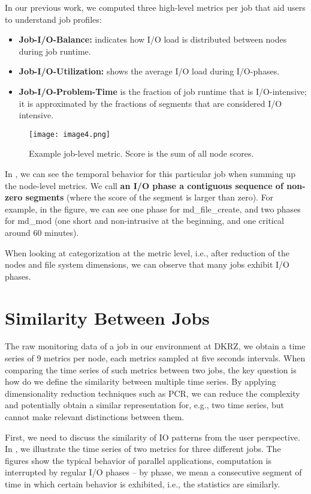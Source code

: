 \documentclass{jhps}
\begin{document}
In our previous work, we computed three high-level metrics per job that aid users to understand job profiles:

\begin{itemize}
	\item \textbf{Job-I/O-Balance:} indicates how I/O load is distributed between nodes during job runtime.
	\item \textbf{Job-I/O-Utilization:} shows the average I/O load during I/O-phases.
	\item \textbf{Job-I/O-Problem-Time} is the fraction of job runtime that is I/O-intensive; it is approximated by the fractions of segments that are considered I/O intensive.
\end{itemize}

\begin{figure}[!bt]
	\centering
	\texttt{[image: image4.png]}
	\caption{Example job-level metric.
Score is the sum of all node scores.}
	\label{fig:seg_example}
\end{figure}

In , we can see the temporal behavior for this particular job when summing up the node-level metrics.
We call \textbf{an I/O phase a contiguous sequence of non-zero segments} (where the score of the segment is larger than zero).
For example, in the figure, we can see one phase for md\_file\_create, and two phases for md\_mod (one short and non-intrusive at the beginning, and one critical around 60 minutes).

When looking at categorization at the metric level, i.e., after reduction of the nodes and file system dimensions, we can observe that many jobs exhibit I/O phases.

\section{Similarity Between Jobs}
The raw monitoring data of a job in our environment at DKRZ, we obtain a time series of 9 metrics per node, each metrics sampled at five seconds intervals.
When comparing the time series of such metrics between two jobs, the key question is how do we define the similarity between multiple time series.
By applying dimensionality reduction techniques such as PCR, we can reduce the complexity and potentially obtain a similar representation for, e.g., two time series, but cannot make relevant distinctions between them.

First, we need to discuss the similarity of IO patterns from the user perspective.
In , we illustrate the time series of two metrics for three different jobs.
The figures show the typical behavior of parallel applications, computation is interrupted by regular I/O phases -- by phase, we mean a consecutive segment of time in which  certain behavior is exhibited, i.e., the statistics are similarly.
\end{document}
